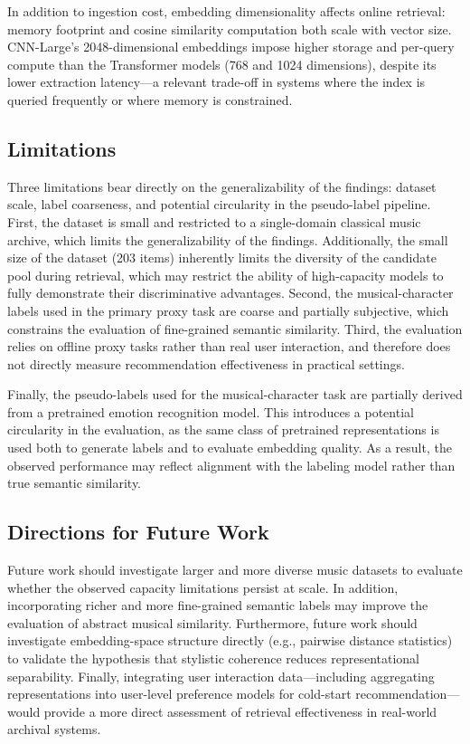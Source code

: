 \documentclass{article}
\begin{document}
In addition to ingestion cost, embedding dimensionality affects online retrieval: memory footprint and cosine similarity computation both scale with vector size. CNN-Large's 2048-dimensional embeddings impose higher storage and per-query compute than the Transformer models (768 and 1024 dimensions), despite its lower extraction latency---a relevant trade-off in systems where the index is queried frequently or where memory is constrained.

\subsection{Limitations}

Three limitations bear directly on the generalizability of the findings: dataset scale, label coarseness, and potential circularity in the pseudo-label pipeline. First, the dataset is small and restricted to a single-domain classical music archive, which limits the generalizability of the findings. Additionally, the small size of the dataset (203 items) inherently limits the diversity of the candidate pool during retrieval, which may restrict the ability of high-capacity models to fully demonstrate their discriminative advantages. Second, the musical-character labels used in the primary proxy task are coarse and partially subjective, which constrains the evaluation of fine-grained semantic similarity. Third, the evaluation relies on offline proxy tasks rather than real user interaction, and therefore does not directly measure recommendation effectiveness in practical settings.

\smallskip
Finally, the pseudo-labels used for the musical-character task are partially derived from a pretrained emotion recognition model. This introduces a potential circularity in the evaluation, as the same class of pretrained representations is used both to generate labels and to evaluate embedding quality. As a result, the observed performance may reflect alignment with the labeling model rather than true semantic similarity.

\subsection{Directions for Future Work}

Future work should investigate larger and more diverse music datasets to evaluate whether the observed capacity limitations persist at scale. In addition, incorporating richer and more fine-grained semantic labels may improve the evaluation of abstract musical similarity. Furthermore, future work should investigate embedding-space structure directly (e.g., pairwise distance statistics) to validate the hypothesis that stylistic coherence reduces representational separability. Finally, integrating user interaction data---including aggregating representations into user-level preference models for cold-start recommendation---would provide a more direct assessment of retrieval effectiveness in real-world archival systems.
\end{document}
